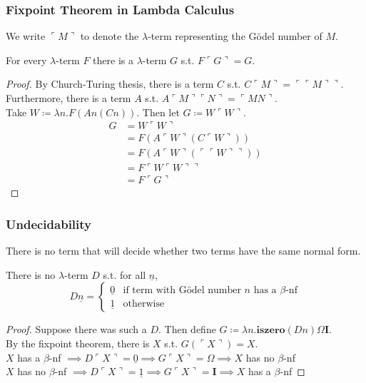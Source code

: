 \documentclass[UTF8,11pt,colorlinks,compress,openany]{beamer}%
\begin{document}
\begin{frame}\frametitle{Fixpoint Theorem in Lambda Calculus}
	We write $\ulcorner M\urcorner$ to denote the $\lambda$-term representing the G\"odel number of $M$.
	\begin{theorem}
		For every $\lambda$-term $F$ there is a $\lambda$-term $G$ s.t. $F\ulcorner G\urcorner=G$.
	\end{theorem}
	\begin{proof}
		By Church-Turing thesis, there is a term $C$ s.t. $C\ulcorner M\urcorner=\ulcorner\ulcorner M\urcorner\urcorner$.\\
		Furthermore, there is a term $A$ s.t. $A\ulcorner M\urcorner\ulcorner N\urcorner=\ulcorner MN\urcorner$.\\
		Take $W\coloneqq \lambda n.F(An(Cn))$. Then let $G\coloneqq W\ulcorner W\urcorner$.
	\setlength\belowdisplayskip{0pt}
		\begin{align*}
		G&=W\ulcorner W\urcorner\\
		&=F(A\ulcorner W\urcorner(C\ulcorner W\urcorner))\\
		&=F(A\ulcorner W\urcorner(\ulcorner\ulcorner W\urcorner\urcorner))\\
		&=F\ulcorner W\ulcorner W\urcorner\urcorner\\
		&=F\ulcorner G\urcorner
		\end{align*}
	\end{proof}
\end{frame}

\begin{frame}\frametitle{Undecidability}
	\begin{theorem}[Church1936]
		There is no term that will decide whether two terms have the same normal form.
	\end{theorem}
	\begin{theorem}[Church1936]
		There is no $\lambda$-term $D$ s.t. for all $\underline{n}$,
		\[D\underline{n}=
		\begin{cases}
		\underline{0}&\text{if term with G\"odel number $n$ has a $\beta$-nf}\\
		\underline{1}&\text{otherwise}
		\end{cases}\]
	\end{theorem}
	\begin{proof}
		Suppose there was such a $D$. Then define $G\coloneqq \lambda n.\mathbf{iszero}(Dn)\Omega\mathbf{I}$.\\
		By the fixpoint theorem, there is $X$ s.t. $G(\ulcorner X\urcorner)=X$.\\
		$X$ has a $\beta$-nf $\implies D\ulcorner X\urcorner=\underline{0}\implies G\ulcorner X\urcorner=\Omega\implies X$ has no $\beta$-nf\\
		$X$ has no $\beta$-nf $\implies D\ulcorner X\urcorner=\underline{1}\implies G\ulcorner X\urcorner=\mathbf{I}\implies X$ has a $\beta$-nf
	\end{proof}
\end{frame}
\end{document}
